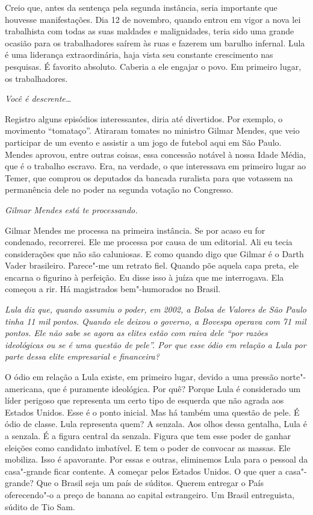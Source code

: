 \normalfont 
Creio que, antes da sentença pela segunda instância,
seria importante que houvesse manifestações. Dia 12 de novembro, quando
entrou em vigor a nova lei trabalhista com todas as suas maldades e
malignidades, teria sido uma grande ocasião para os trabalhadores saírem
às ruas e fazerem um barulho infernal. Lula é uma liderança
extraordinária, haja vista seu constante crescimento nas pesquisas. É
favorito absoluto. Caberia a ele engajar o povo. Em primeiro lugar, os
trabalhadores.

\itshape
 Você é descrente…

\normalfont 
Registro alguns episódios interessantes, diria até
divertidos. Por exemplo, o movimento ``tomataço''. Atiraram tomates no
ministro Gilmar Mendes, que veio participar de um evento e assistir a um
jogo de futebol aqui em São Paulo. Mendes aprovou, entre outras coisas,
essa concessão notável à nossa Idade Média, que é o trabalho escravo.
Era, na verdade, o que interessava em primeiro lugar ao Temer, que
comprou os deputados da bancada ruralista para que votassem na
permanência dele no poder na segunda votação no Congresso.

\itshape
 Gilmar Mendes está te processando.

\normalfont 
Gilmar Mendes me processa na primeira instância. Se por
acaso eu for condenado, recorrerei. Ele me processa por causa de um
editorial. Ali eu tecia considerações que não são caluniosas. E como
quando digo que Gilmar é o Darth Vader brasileiro. Parece"-me um retrato
fiel. Quando põe aquela capa preta, ele encarna o figurino à perfeição.
Eu disse isso à juíza que me interrogava. Ela começou a rir. Há
magistrados bem"-humorados no Brasil.

\itshape
 Lula diz que, quando assumiu o poder, em 2002, a Bolsa
de Valores de São Paulo tinha 11 mil pontos. Quando ele deixou o
governo, a Bovespa operava com 71 mil pontos. Ele não sabe se agora as
elites estão com raiva dele ``por razões ideológicas ou se é uma questão
de pele''. Por que esse ódio em relação a Lula por parte dessa elite
empresarial e financeira?

\normalfont 
O ódio em relação a Lula existe, em primeiro lugar,
devido a uma pressão norte"-americana, que é puramente ideológica.
Por quê? Porque Lula é
considerado um líder perigoso que representa um certo tipo de esquerda
que não agrada aos Estados Unidos. Esse é o ponto inicial. Mas há também
uma questão de pele. É ódio de classe. Lula representa quem? A senzala.
Aos olhos dessa gentalha, Lula é a senzala. É a figura central da
senzala. Figura que tem esse poder de ganhar eleições como candidato
imbatível. E tem o poder de convocar as massas. Ele mobiliza. Isso é
apavorante. Por essas e outras, eliminemos Lula para o pessoal da
casa"-grande ficar contente. A começar pelos Estados Unidos. O que quer a
casa"-grande? Que o Brasil seja um país de súditos. Querem entregar o
País oferecendo"-o a preço de banana ao capital estrangeiro. Um Brasil
entreguista, súdito de Tio Sam.

